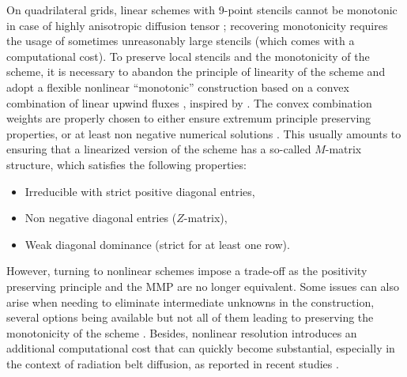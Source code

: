 \documentclass[final,11pt]{elsarticle}
\begin{document}
On quadrilateral grids, linear schemes with 9-point stencils cannot be monotonic in case of highly anisotropic diffusion tensor \cite{KER81,BC05}; recovering monotonicity requires the usage of sometimes unreasonably large stencils \cite{LP09} (which comes with a computational cost). To preserve local stencils and the monotonicity of the scheme, it is necessary to abandon the principle of linearity of the scheme and adopt a flexible nonlinear ``monotonic'' construction based on a convex combination of linear upwind fluxes \cite{droniou2014,schneider2018}, inspired by \cite{BER05}. The convex combination weights are properly chosen to either ensure extremum principle preserving properties, or at least non negative numerical solutions \cite{DLP10,sheng2011,sheng20,LEP10,yuan2008,LEP09,CAN13,LIP09-II,LIP12,LIP07}. This usually amounts to ensuring that a linearized version of the scheme has a so-called $M$-matrix structure, which satisfies the following properties:
\begin{itemize}[itemsep=0pt]
    \item Irreducible with strict positive diagonal entries,
    \item Non negative diagonal entries ($Z$-matrix),
    \item Weak diagonal dominance (strict for at least one row).
\end{itemize}
However, turning to nonlinear schemes impose a trade-off as the positivity preserving principle and the MMP are no longer equivalent. Some issues can also arise when needing to eliminate intermediate unknowns in the construction, several options being available but not all of them leading to preserving the monotonicity of the scheme \cite{sheng20,agelas09,sheng2011,sheng18}. Besides, nonlinear resolution introduces an additional computational cost that can quickly become substantial, especially in the context of radiation belt diffusion, as reported in recent studies \cite{dahmen2020a}.
\end{document}
